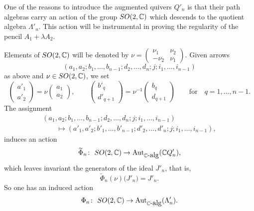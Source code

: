 \documentclass[11pt]{article}
\numberwithin{equation}{section}
\numberwithin{equation}{section}
\begin{document}
One of the reasons to introduce the augmented quivers $Q'_{n}$ is that their path algebras carry
an action of the group ${\rm SO}(2, \mathbb{C})$ which descends to the quotient algebra $\Lambda'_{n}$. This
action will be instrumental in proving the regularity of the pencil $A_1 + \lambda A_2$.

Elements of ${\rm SO}(2, \mathbb{C})$ will be denoted by $\nu= \left(\begin{smallmatrix} \nu_1 & \nu_2 \\ -\nu_2 & \nu_1\end{smallmatrix}\right)$. Given arrows
\[(a_{1},a_{2};b_{1},\dots,b_{n-1};d_{2},\dots,d_{n};j;i_{1},\dots,i_{n-1})\]
as above and $\nu\in {\rm SO}(2,\mathbb{C})$, we set
\begin{equation*}
\begin{pmatrix}a'_{1} \\ a'_{2} \end{pmatrix} = \nu \begin{pmatrix}a_{1} \\ a_{2} \end{pmatrix},
\qquad
\begin{pmatrix}b'_{q} \\ d'_{q+1} \end{pmatrix} = \nu^{-1}\begin{pmatrix}b_{q} \\ d_{q+1} \end{pmatrix}
\qquad\text{for}\quad q=1,\dots,n-1 .
\end{equation*}
The assignment
\begin{gather*}
(a_{1},a_{2};b_{1},\dots,b_{n-1};d_{2},\dots,d_{n};j;i_{1},\dots,i_{n-1}) \\ \qquad{} \longmapsto(a'_{1},a'_{2};b'_{1},\dots,b'_{n-1};d'_{2},\dots,d'_{n};j;i_{1},\dots,i_{n-1}) ,
\end{gather*}
induces an action
\[\widetilde\Phi_n \colon \ {\rm SO}(2,\mathbb{C}) \to \operatorname{Aut}_{\mathbb{C}\hbox{-alg}} (\mathbb{C} Q'_{n}) ,\]
which leaves invariant the generators of the ideal $J'_{n}$, that is,
\begin{equation*}
\widetilde{\Phi}_{n} (\nu) \bigl(J'_{n}\bigr) =J'_{n} .
\end{equation*}
So one has an induced action
\[\Phi_n \colon \ {\rm SO}(2,\mathbb{C}) \to \operatorname{Aut}_{\mathbb{C}\hbox{-alg}} (\Lambda'_{n}) .\]
\end{document}
